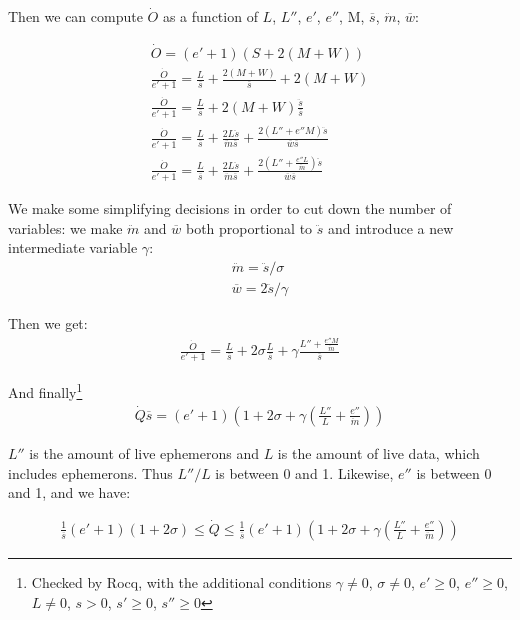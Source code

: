 \documentclass{article}
\begin{document}
Then we can compute $\dot{O}$ as a function of $L$, $L''$, $e'$,
$e''$, M, $\overline{s}$, $\ddot{m}$, $\overline{w}$:

\begin{gather}
\dot{O} = (e'+1)(S + 2(M+W)) \\
\frac{\dot{O}}{e'+1}
 = \frac{L}{\overline{s}} + \frac{2(M+W)}{\overline{s}} + 2(M+W) \\
\frac{\dot{O}}{e'+1}
 = \frac{L}{\overline{s}} + 2(M+W)\frac{\ddot{s}}{\overline{s}} \\
\frac{\dot{O}}{e'+1}
 = \frac{L}{\overline{s}} + \frac{2L\ddot{s}}{\ddot{m}\overline{s}}
     + \frac{2(L''+e''M)\ddot{s}}{\overline{w}\overline{s}} \\
\frac{\dot{O}}{e'+1}
 = \frac{L}{\overline{s}} + \frac{2L\ddot{s}}{\ddot{m}\overline{s}}
     + \frac{2(L''+\frac{e''L}{\ddot{m}})\ddot{s}}{\overline{w}\overline{s}}
\end{gather}

\bigskip
\bigskip
\bigskip

We make some simplifying decisions in order to cut down the number of
variables: we make $\ddot{m}$ and $\overline{w}$ both proportional to
$\ddot{s}$ and introduce a new intermediate variable $\gamma$:
\begin{gather}
\ddot{m} = \ddot{s} / \sigma \label{eqn-ms} \\
\overline{w} = 2\ddot{s} / \gamma \label{eqn-ws}
\end{gather}

Then we get:
\begin{gather}
\frac{\dot{O}}{e'+1}
 = \frac{L}{\overline{s}} + 2\sigma\frac{L}{\overline{s}}
     + \gamma\frac{L'' + \frac{e''M}{\ddot{m}}}{\overline{s}}
\end{gather}

And finally\footnote{
Checked by Rocq, with the additional conditions
$\gamma \neq 0$,
$\sigma \neq 0$,
$e' \geq 0$,
$e'' \geq 0$,
$L \neq 0$,
$s > 0$,
$s' \geq 0$,
$s'' \geq 0$
}
\begin{gather}
\dot{Q}\overline{s} = (e'+1) (1 + 2\sigma + \gamma(\frac{L''}{L} + \frac{e''}{\ddot{m}}))
\end{gather}

$L''$ is the amount of live ephemerons and $L$ is the amount of live
data, which includes ephemerons. Thus $L''/L$ is between 0 and 1.
Likewise, $e''$ is between 0 and 1, and we have:

\begin{gather}
\frac{1}{\overline{s}}(e'+1)(1 + 2\sigma) \leq \dot{Q} \leq
\frac{1}{\overline{s}}(e'+1)(1 + 2\sigma + \gamma(\frac{L''}{L} + \frac{e''}{\ddot{m}}))
\end{gather}
\end{document}
